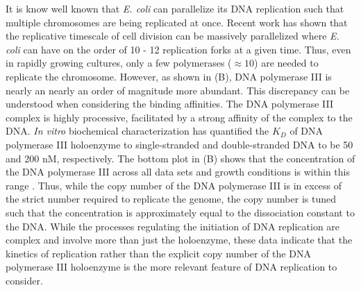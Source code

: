 It is know well known that \textit{E. coli} can parallelize its DNA
replication such that multiple chromosomes are being replicated at once.
Recent work \citep{si2017} has shown that the replicative timescale of cell
division can be massively parallelized where \textit{E. coli} can have on the
order of 10 - 12 replication forks at a given time. Thus, even in rapidly
growing cultures, only a few polymerases ($\approx 10$) are needed to
replicate the chromosome. However, as shown in (B), DNA
polymerase III is nearly an nearly an order of magnitude more abundant. This
discrepancy can be understood when considering the binding affinities. The
DNA polymerase III complex is highly processive, facilitated by a strong
affinity of the complex to the DNA. \textit{In vitro} biochemical
characterization has quantified the $K_D$ of DNA polymerase III holoenzyme to
single-stranded and double-stranded DNA to be 50 and 200 nM, respectively.
The bottom plot in (B) shows that the concentration of the
DNA polymerase III across all data sets and growth conditions is within this
range \citep{ason2000}. Thus, while the copy number of the DNA polymerase III
is in excess of the strict number required to replicate the genome, the copy
number is tuned such that the concentration is approximately equal to the
dissociation constant to the DNA. While the processes regulating the
initiation of DNA replication are complex and involve more than just the
holoenzyme, these data indicate that the kinetics of replication rather than
the explicit copy number of the DNA polymerase III holoenzyme is the more
relevant feature of DNA replication to consider.

